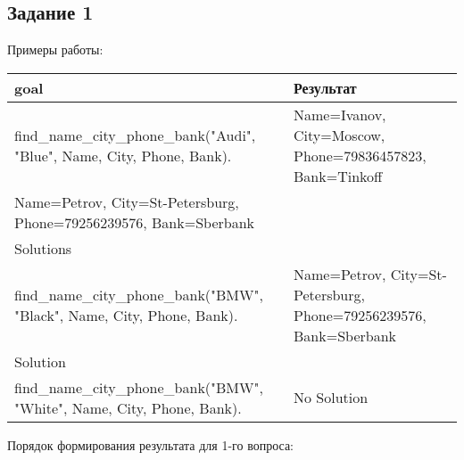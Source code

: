 \documentclass[a4paper,12pt]{article}
\begin{document}
\subsection*{Задание 1}

Примеры работы:	
\begin{table}[ht!] 
	\begin{tabularx}{\linewidth}{|>{\centering}X|>{\centering}X|}
	\hline
	goal & Результат \tabularnewline
	\hline
		find\_name\_city\_phone\_bank("Audi"{}, "Blue"{}, Name, City, Phone, Bank). & 
		Name=Ivanov, City=Moscow, Phone=79836457823, Bank=Tinkoff\\
		Name=Petrov, City=St-Petersburg, Phone=79256239576, Bank=Sberbank\\
		2 Solutions \tabularnewline
	\hline
		find\_name\_city\_phone\_bank("BMW"{}, "Black"{}, Name, City, Phone, Bank). & 
		Name=Petrov, City=St-Petersburg, Phone=79256239576, Bank=Sberbank\\
		1 Solution \tabularnewline
	\hline
		find\_name\_city\_phone\_bank("BMW"{}, "White"{}, Name, City, Phone, Bank). & 
		No Solution \tabularnewline
	\hline
	\end{tabularx}
\end{table}
	
Порядок формирования результата для 1-го вопроса:
\end{document}
